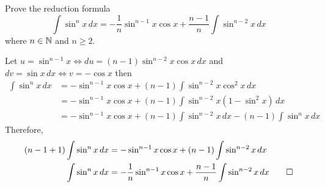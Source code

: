 \begin{problem}
    Prove the reduction formula
    \[\int\sin^n x\,dx
    =-\frac{1}{n}\sin^{n-1}x\cos x+\frac{n-1}{n}\int\sin^{n-2}x\,dx\]
    where \(n\in\mathbb{N}\) and \(n\geq 2\).
\end{problem}
\begin{solution}
    Let \(u=\sin^{n-1}x\iff du=(n-1)\sin^{n-2}x\cos x\,dx\) and
    \(dv=\sin x\,dx\iff v=-\cos x\) then
    \begin{align*}
    \int\sin^n x\,dx
    &= -\sin^{n-1}x\cos x+(n-1)\int \sin^{n-2}x\cos^2 x\,dx \\
    &= -\sin^{n-1}x\cos x+(n-1)\int \sin^{n-2}x(1-\sin^2 x)\,dx \\
    &= -\sin^{n-1}x\cos x+(n-1)\int \sin^{n-2}x\,dx-(n-1)\int\sin^n x\,dx
    \end{align*}
    Therefore,
    \begin{align*}
    (n-1+1)\int\sin^n x\,dx &= -\sin^{n-1}x\cos x+(n-1)\int \sin^{n-2}x\,dx \\
    \int\sin^n x\,dx
    &= -\frac{1}{n}\sin^{n-1}x\cos x+\frac{n-1}{n}\int\sin^{n-2}x\,dx \qedhere
    \end{align*}
\end{solution}